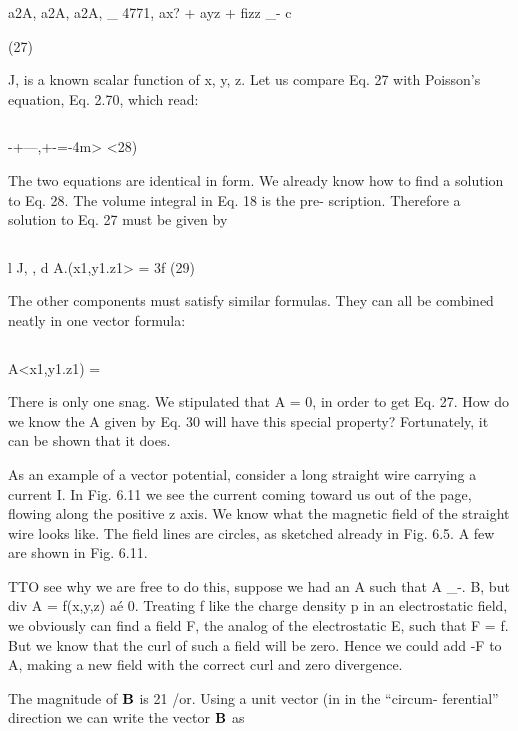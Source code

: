 \begin{equation}
\end{equation}

a2A, a2A, a2A, _ 4771,
ax? + ayz + fizz _- c

(27)

J, is a known scalar function of x, y, z. Let us compare Eq. 27 with
Poisson's equation, Eq. 2.70, which read:

\begin{equation}
\end{equation}

-+---,+-=-4m> <28)

The two equations are identical in form. We already know how to
find a solution to Eq. 28. The volume integral in Eq. 18 is the pre-
scription. Therefore a solution to Eq. 27 must be given by

\begin{equation}
\end{equation}

l J, , d
A.(x1,y1.z1> = 3f (29)

The other components must satisfy similar formulas. They can all
be combined neatly in one vector formula:

\begin{equation}
\end{equation}

A<x1,y1.z1) = %

There is only one snag. We stipulated that \div A = 0, in order to
get Eq. 27. How do we know the A given by Eq. 30 will have this
special property? Fortunately, it can be shown that it does.

As an example of a vector potential, consider a long straight wire
carrying a current I. In Fig. 6.11 we see the current coming toward
us out of the page, flowing along the positive z axis. We know what
the magnetic field of the straight wire looks like. The field lines are
circles, as sketched already in Fig. 6.5. A few are shown in Fig. 6.11.

TTO see why we are free to do this, suppose we had an A such that \curl A _-. B, but
div A = f(x,y,z) aé 0. Treating f like the charge density p in an electrostatic field, we
obviously can find a field F, the analog of the electrostatic E, such that \div F = f.
But we know that the curl of such a field will be zero. Hence we could add -F to A,
making a new field with the correct curl and zero divergence.

The magnitude of $\mathbf{B}$ is 21 /or. Using a unit vector (in in the ``circum-
ferential'' direction we can write the vector $\mathbf{B}$ as

